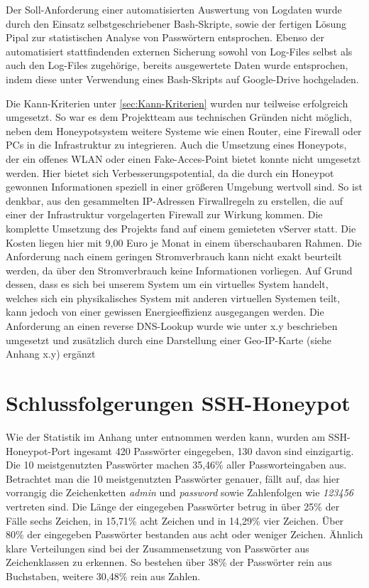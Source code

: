 Der Soll-Anforderung einer automatisierten Auswertung von Logdaten wurde durch den Einsatz selbstgeschriebener Bash-Skripte, sowie der fertigen Lösung Pipal zur statistischen Analyse von Passwörtern entsprochen. Ebenso der automatisiert stattfindenden externen Sicherung sowohl von Log-Files selbst als auch den Log-Files zugehörige, bereits ausgewertete Daten wurde entsprochen, indem diese unter Verwendung eines Bash-Skripts auf Google-Drive hochgeladen. 

Die Kann-Kriterien unter \ref{sec:Kann-Kriterien} wurden nur teilweise erfolgreich umgesetzt. So war es dem Projektteam aus technischen Gründen nicht möglich, neben dem Honeypotsystem weitere Systeme wie einen Router, eine Firewall oder PCs in die Infrastruktur zu integrieren. Auch die Umsetzung eines Honeypots, der ein offenes WLAN oder einen Fake-Acces-Point bietet konnte nicht umgesetzt werden. Hier bietet sich Verbesserungspotential, da die durch ein Honeypot gewonnen Informationen speziell in einer größeren Umgebung wertvoll sind. So ist denkbar, aus den gesammelten IP-Adressen Firwallregeln zu erstellen, die auf einer der Infrastruktur vorgelagerten Firewall zur Wirkung kommen.
Die komplette Umsetzung des Projekts fand auf einem gemieteten vServer statt. Die Kosten liegen hier mit 9,00 Euro je Monat in einem überschaubaren Rahmen. Die Anforderung nach einem geringen Stromverbrauch kann nicht exakt beurteilt werden, da über den Stromverbrauch keine Informationen vorliegen. Auf Grund dessen, dass es sich bei unserem System um ein virtuelles System handelt, welches sich ein physikalisches System mit anderen virtuellen Systemen teilt, kann jedoch von einer gewissen Energieeffizienz ausgegangen werden. Die Anforderung an einen reverse DNS-Lookup wurde wie unter x.y beschrieben umgesetzt und zusätzlich durch eine Darstellung einer Geo-IP-Karte (siehe Anhang x.y) ergänzt

\section{Schlussfolgerungen SSH-Honeypot}
\label{sec:Schlussfolgerungen SSH-Honeypot}

Wie der Statistik im Anhang unter  entnommen werden kann, wurden am SSH-Honeypot-Port ingesamt 420 Passwörter eingegeben, 130 davon sind einzigartig. Die 10 meistgenutzten Passwörter machen 35,46\% aller Passworteingaben aus. Betrachtet man die 10 meistgenutzten Passwörter genauer, fällt auf, das hier vorrangig die Zeichenketten \textit{admin} und \textit{password} sowie Zahlenfolgen wie \textit{123456} vertreten sind. Die Länge der eingegeben Passwörter betrug in über 25\% der Fälle sechs Zeichen, in 15,71\% acht Zeichen und in 14,29\% vier Zeichen. Über 80\% der eingegeben Passwörter bestanden aus acht oder weniger Zeichen. Ähnlich klare Verteilungen sind bei der Zusammensetzung von Passwörter aus Zeichenklassen zu erkennen. So bestehen über 38\% der Passwörter rein aus Buchstaben, weitere 30,48\% rein aus Zahlen.\\

